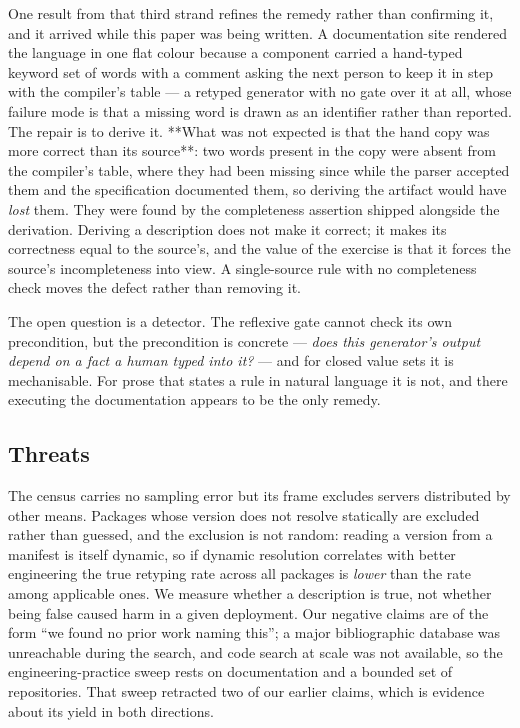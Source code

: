 \documentclass[10pt,conference]{IEEEtran}
\begin{document}
One result from that third strand refines the remedy rather than confirming it, and it arrived
while this paper was being written. A documentation site rendered the language in one flat
colour because a component carried a hand-typed keyword set of \factHandTypedWords{} words with
a comment asking the next person to keep it in step with the compiler's table --- a retyped
generator with no gate over it at all, whose failure mode is that a missing word is drawn as an
identifier rather than reported. The repair is to derive it. **What was not expected is that the
hand copy was more correct than its source**: two words present in the copy were absent from the
compiler's table, where they had been missing since \factUntabledSince{} while the parser
accepted them and the specification documented them, so deriving the artifact would have
\emph{lost} them. They were found by the completeness assertion shipped alongside the
derivation. Deriving a description does not make it correct; it makes its correctness equal to
the source's, and the value of the exercise is that it forces the source's incompleteness into
view. A single-source rule with no completeness check moves the defect rather than removing it.

The open question is a detector. The reflexive gate cannot check its own precondition, but
the precondition is concrete --- \emph{does this generator's output depend on a fact a
human typed into it?} --- and for closed value sets it is mechanisable. For prose that
states a rule in natural language it is not, and there executing the documentation appears
to be the only remedy.

\subsection{Threats}

The census carries no sampling error but its frame excludes servers distributed by other
means. Packages whose version does not resolve statically are excluded rather than
guessed, and the exclusion is not random: reading a version from a manifest is itself
dynamic, so if dynamic resolution correlates with better engineering the true retyping
rate across all packages is \emph{lower} than the rate among applicable ones. We measure
whether a description is true, not whether being false caused harm in a given deployment.
Our negative claims are of the form ``we found no prior work naming this''; a major
bibliographic database was unreachable during the search, and code search at scale was
not available, so the engineering-practice sweep rests on documentation and a bounded set
of repositories. That sweep retracted two of our earlier claims, which is evidence about
its yield in both directions.
\end{document}
